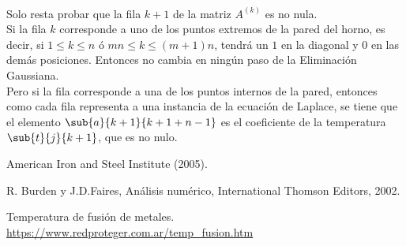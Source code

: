 \documentclass[12pt]{article}
\begin{document}
\begin{itemize}
\paragraph{} Solo resta probar que la fila \(k+1\) de la matriz \(A^{(k)}\) es no nula. \\
Si la fila $k$ corresponde a uno de los puntos extremos de la pared del horno, es decir, si \(1 \leq k \leq n \text{ ó } mn \leq k \leq (m+1)n\), tendrá un $1$ en la diagonal y $0$ en las demás posiciones. Entonces no cambia en ningún paso de la Eliminación Gaussiana. \\
Pero si la fila corresponde a una de los puntos internos de la pared, entonces como cada fila representa a una instancia de la ecuación de Laplace, se tiene que el elemento \(\sub{a}{k+1}{k+1+n-1}\) es el coeficiente de la temperatura \(\sub{t}{j}{k+1}\), que es no nulo. 

\end{itemize}

\pagebreak
\listoffigures

\begin{thebibliography}{9}
American Iron and Steel Institute (2005). %

R. Burden y J.D.Faires, Análisis numérico, International Thomson Editors, 2002.

Temperatura de fusión de metales. \url{https://www.redproteger.com.ar/temp_fusion.htm}

\end{thebibliography}
\end{document}
